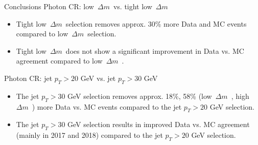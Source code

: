 \documentclass[10pt,xcolor=svgnames,fleqn,aspectratio=169]{beamer}
\newcommand{\lowdm}{low~$\Delta m$~}
\newcommand{\highdm}{high~$\Delta m$~}
\begin{document}
\begin{frame}{Conclusions}
Photon CR: \lowdm vs. tight \lowdm
\begin{itemize}
\item Tight \lowdm  selection removes approx. 30\% more Data and MC events compared to \lowdm selection.
\item Tight \lowdm does not show a significant improvement in Data vs. MC agreement compared to \lowdm.
\end{itemize}
Photon CR: jet $p_{T} > 20$ GeV vs. jet $p_{T} > 30$ GeV
\begin{itemize}
\item The jet $p_{T} > 30$ GeV selection removes approx. 18\%, 58\% (\lowdm, \highdm) more Data vs. MC events compared to the jet $p_{T} > 20$ GeV selection.
\item The jet $p_{T} > 30$ GeV selection results in improved Data vs. MC agreement (mainly in 2017 and 2018) compared to the jet $p_{T} > 20$ GeV selection.
\end{itemize}
\end{frame}




\end{document}
